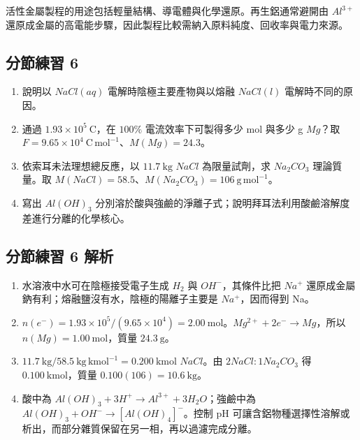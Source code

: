 \documentclass[11pt,a4paper]{article}
\providecommand{\tightlist}{%
  \setlength{\itemsep}{0pt}\setlength{\parskip}{0pt}}
\begin{document}
活性金屬製程的用途包括輕量結構、導電體與化學還原。再生鋁通常避開由 \(Al^{3+}\) 還原成金屬的高電能步驟，因此製程比較需納入原料純度、回收率與電力來源。

\subsection{分節練習 6}\label{ux5206ux7bc0ux7df4ux7fd2-6}

\begin{enumerate}
\def\labelenumi{\arabic{enumi}.}
\tightlist
\item
  說明以 \(NaCl(aq)\) 電解時陰極主要產物與以熔融 \(NaCl(l)\) 電解時不同的原因。
\item
  通過 \(1.93\times10^5\ \mathrm{C}\)，在 \(100\%\) 電流效率下可製得多少 mol 與多少 g \(Mg\)？取 \(F=9.65\times10^4\ \mathrm{C\,mol^{-1}}\)、\(M(Mg)=24.3\)。
\item
  依索耳未法理想總反應，以 \(11.7\ \mathrm{kg}\) \(NaCl\) 為限量試劑，求 \(Na_2CO_3\) 理論質量。取 \(M(NaCl)=58.5\)、\(M(Na_2CO_3)=106\ \mathrm{g\,mol^{-1}}\)。
\item
  寫出 \(Al(OH)_3\) 分別溶於酸與強鹼的淨離子式；說明拜耳法利用酸鹼溶解度差進行分離的化學核心。
\end{enumerate}

\subsection{分節練習 6 解析}\label{ux5206ux7bc0ux7df4ux7fd2-6-ux89e3ux6790}

\begin{enumerate}
\def\labelenumi{\arabic{enumi}.}
\tightlist
\item
  水溶液中水可在陰極接受電子生成 \(H_2\) 與 \(OH^-\)，其條件比把 \(Na^+\) 還原成金屬鈉有利；熔融鹽沒有水，陰極的陽離子主要是 \(Na^+\)，因而得到 Na。
\item
  \(n(e^-)=1.93\times10^5/(9.65\times10^4)=2.00\ \mathrm{mol}\)。\(Mg^{2+}+2e^-\rightarrow Mg\)，所以 \(n(Mg)=1.00\ \mathrm{mol}\)，質量 \(24.3\ \mathrm{g}\)。
\item
  \(11.7\ \mathrm{kg}/58.5\ \mathrm{kg\,kmol^{-1}}=0.200\ \mathrm{kmol}\) \(NaCl\)。由 \(2NaCl:1Na_2CO_3\) 得 \(0.100\ \mathrm{kmol}\)，質量 \(0.100(106)=10.6\ \mathrm{kg}\)。
\item
  酸中為 \(Al(OH)_3+3H^+\rightarrow Al^{3+}+3H_2O\)；強鹼中為 \(Al(OH)_3+OH^-\rightarrow[Al(OH)_4]^-\)。控制 pH 可讓含鋁物種選擇性溶解或析出，而部分雜質保留在另一相，再以過濾完成分離。
\end{enumerate}
\end{document}
